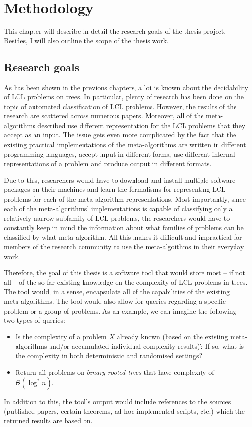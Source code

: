 \chapter{Methodology}
\label{chapter:methods}

This chapter will describe in detail the research goals of the thesis project. Besides, I will also outline the scope of the thesis work.

\section{Research goals}

As has been shown in the previous chapters, a lot is known about the decidability
of LCL problems on trees. In particular, plenty of research has been done
on the topic of automated classification of LCL problems. However, the
results of the research are scattered across numerous papers. Moreover,
all of the meta-algorithms described use different representation for
the LCL problems that they accept as an input.
The issue gets even more complicated by the fact that the existing practical implementations
of the meta-algorithms are written in different programming languages, accept input in
different forms,
use different internal representations of a problem and produce output in different
formats.

Due to this, researchers would
have to download and install multiple software packages on their machines and learn
the formalisms for representing LCL problems for each of the meta-algorithm
representations. Most importantly, since each of the meta-algorithms' implementations
is capable of classifying only a relatively narrow subfamily of LCL problems, the
researchers would have to constantly keep in mind the information about what families
of problems can be classified by what meta-algorithm.
All this makes it difficult and impractical for members of
the research community
to use the meta-algoithms in their everyday work.

Therefore, the goal of this thesis is a software tool that would store most -- if not all -- of
the so far existing knowledge on the complexity of LCL problems in trees.
The tool would, in a sense, encapsulate all of the capabilities
of the existing meta-algorithms.
The tool would also allow for queries regarding a specific problem or a group of
problems. As an example, we can imagine the following two types of queries:
\begin{itemize}
  \item Is the complexity of a problem $X$ already known (based on the existing meta-algorithms
  and/or accumulated individual complexity results)? If so, what is the complexity in both
  deterministic and randomised settings?
  \item Return all problems on \emph{binary rooted trees} that have complexity of
  $\Theta(\log^* n)$.
\end{itemize}
In addition to this, the tool’s output would include references to
the sources
(published papers, certain theorems, ad-hoc implemented scripts, etc.)
which the returned results are based on.

